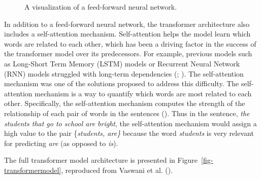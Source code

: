 \documentclass[
  12pt,
  letterpaper,
]{scrreprt}
\begin{document}
\begin{figure}[htbp]

\caption{\label{fig-neuralnet}A visualization of a feed-forward neural
network.}


\end{figure}%

In addition to a feed-forward neural network, the transformer
architecture also includes a self-attention mechanism. Self-attention
helps the model learn which words are related to each other, which has
been a driving factor in the success of the transformer model over its
predecessors. For example, previous models such as Long-Short Term
Memory (LSTM) models or Recurrent Neural Network (RNN) models struggled
with long-term dependencies
(; ). The self-attention mechanism was one of the solutions proposed
to address this difficulty. The self-attention mechanism is a way to
quantify which words are most related to each other. Specifically, the
self-attention mechanism computes the strength of the relationship of
each pair of words in the sentences
(). Thus
in the sentence, \emph{the students that go to school are bright}, the
self-attention mechanism would assign a high value to the pair
\{\emph{students, are\}} because the word \emph{students} is very
relevant for predicting \emph{are} (as opposed to \emph{is}).

The full transformer model architecture is presented in
Figure~\ref{fig-transformermodel}, reproduced from Vaswani et al.
().
\end{document}
